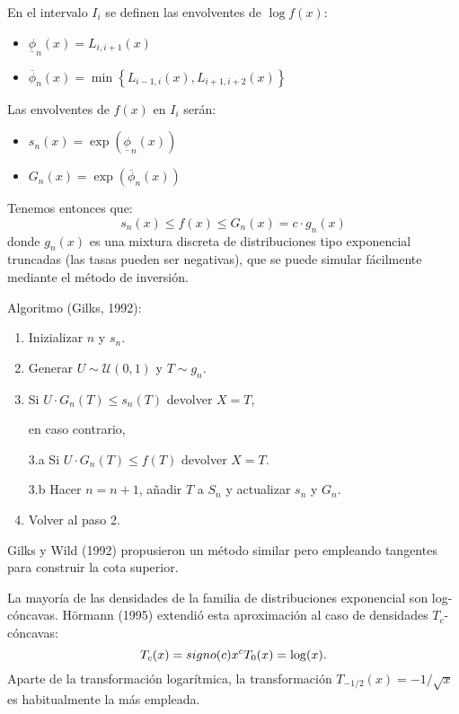 \documentclass[
]{book}
\theoremstyle{break}
\theoremstyle{definition}
\theoremstyle{definition}
\theoremstyle{definition}
\theoremstyle{remark}
\begin{document}
En el intervalo \(I_{i}\) se definen las envolventes de \(\log f\left( x\right)\):

\begin{itemize}
\item
  \(\underline{\phi}_n(x)=L_{i,i+1}(x)\)
\item
  \(\overline{\phi}_n(x)=\min \left\{L_{i-1,i}(x),L_{i+1,i+2}(x)\right\}\)
\end{itemize}

Las envolventes de \(f\left( x\right)\) en \(I_{i}\) serán:

\begin{itemize}
\item
  \(s_n(x)=\exp \left( \underline{\phi}_n(x)\right)\)
\item
  \(G_n(x)=\exp \left( \overline{\phi}_n(x)\right)\)
\end{itemize}

Tenemos entonces que:
\[s_n(x)\leq f\left( x\right) \leq G_n(x)=c\cdot g_n(x)\]
donde \(g_n(x)\) es una mixtura discreta de distribuciones tipo exponencial truncadas
(las tasas pueden ser negativas),
que se puede simular fácilmente mediante el método de inversión.

Algoritmo (Gilks, 1992):

\begin{enumerate}
\def\labelenumi{\arabic{enumi}.}
\item
  Inizializar \(n\) y \(s_n\).
\item
  Generar \(U\sim \mathcal{U}\left( 0,1\right)\) y
  \(T\sim g_n\).
\item
  Si \(U\cdot G_n\left( T\right) \leq s_n\left( T\right)\)
  devolver \(X=T\),

  en caso contrario,

  3.a Si \(U\cdot G_n\left( T\right) \leq f\left( T\right)\)
  devolver \(X=T\).

  3.b Hacer \(n=n+1\), añadir \(T\) a \(S_n\)
  y actualizar \(s_n\) y \(G_n\).
\item
  Volver al paso 2.
\end{enumerate}

Gilks y Wild (1992) propusieron un método similar pero empleando
tangentes para construir la cota superior.

La mayoría de las densidades de la familia de distribuciones
exponencial son log-cóncavas.
Hörmann (1995) extendió esta aproximación al caso de densidades
\(T_{c}\)-cóncavas:
\[T_{c}(x) = signo(c)x^{c} \\
T_{0}(x) = \log (x).\]
Aparte de la transformación logarítmica, la transformación
\(T_{-1/2}(x)=-1/\sqrt{x}\) es habitualmente la más empleada.
\end{document}
